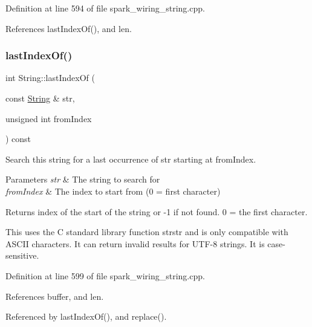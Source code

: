 Definition at line 594 of file spark\+\_\+wiring\+\_\+string.\+cpp.



References last\+Index\+Of(), and len.

\mbox{\label{class_string_a08e7c60202cc42fe4731b52c0c5cd80f}} 
\subsubsection{\texorpdfstring{last\+Index\+Of()}{lastIndexOf()}\hspace{0.1cm}{\footnotesize\ttfamily [4/4]}}
{\footnotesize\ttfamily int String\+::last\+Index\+Of (\begin{DoxyParamCaption}\item[{const \hyperlink{class_string}{String} \&}]{str,  }\item[{unsigned int}]{from\+Index }\end{DoxyParamCaption}) const}



Search this string for a last occurrence of str starting at from\+Index. 


\begin{DoxyParams}{Parameters}
{\em str} & The string to search for\\
\hline
{\em from\+Index} & The index to start from (0 = first character)\\
\hline
\end{DoxyParams}
\begin{DoxyReturn}{Returns}
index of the start of the string or -\/1 if not found. 0 = the first character.
\end{DoxyReturn}
This uses the C standard library function strstr and is only compatible with A\+S\+C\+II characters. It can return invalid results for U\+T\+F-\/8 strings. It is case-\/sensitive. 

Definition at line 599 of file spark\+\_\+wiring\+\_\+string.\+cpp.



References buffer, and len.



Referenced by last\+Index\+Of(), and replace().

\mbox{\label{class_string_a21691d4bac5ec852977018fef6fb9c8a}} 
